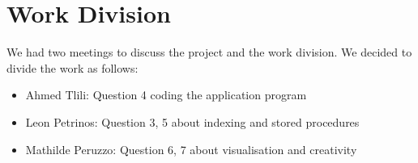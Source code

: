 \documentclass[a4paper,11pt]{article}
\begin{document}
\section*{Work Division}
We had two meetings to discuss the project and the work division. We decided to divide the work as follows:
\begin{itemize}
    \item Ahmed Tlili: Question 4 coding the application program
    \item Leon Petrinos: Question 3, 5 about indexing and stored procedures
    \item Mathilde Peruzzo: Question 6, 7 about visualisation and creativity
\end{itemize}
\end{document}
